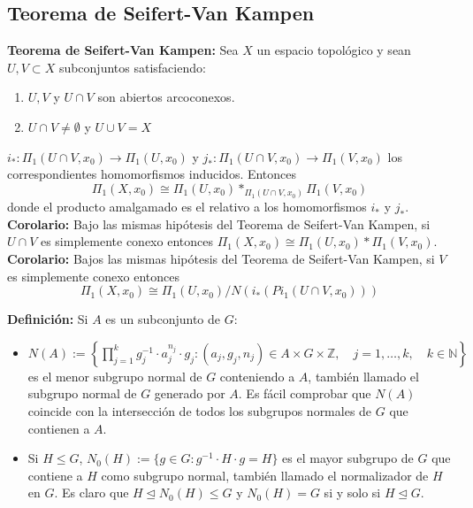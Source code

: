 \documentclass{article}
\begin{document}
\subsection{Teorema de Seifert-Van Kampen}
\textbf{Teorema de Seifert-Van Kampen:} Sea $X$ un espacio topológico y sean $U,V\subset X$ subconjuntos satisfaciendo:
\begin{enumerate}
\item $U,V$ y $U\cap V$ son abiertos arcoconexos.

\item $U\cap V\neq \emptyset$ y $U\cup V=X$
\end{enumerate}

$i_*:\Pi_1(U\cap V,x_0)\rightarrow \Pi_1(U,x_0)$ y $j_*:\Pi_1(U\cap V,x_0)\rightarrow \Pi_1(V,x_0)$ los correspondientes homomorfismos inducidos. Entonces
\begin{equation*}
\Pi_1(X,x_0)\cong \Pi_1(U,x_0)*_{\Pi_1(U\cap V,x_0)}\Pi_1(V,x_0)
\end{equation*}
donde el producto amalgamado es el relativo a los homomorfismos $i_*$ y $j_*$.\\

\textbf{Corolario:} Bajo las mismas hipótesis del Teorema de Seifert-Van Kampen, si $U\cap V$ es simplemente conexo entonces $\Pi_1(X,x_0)\cong \Pi_1(U,x_0)*\Pi_1(V,x_0)$. \\

\textbf{Corolario:} Bajos las mismas hipótesis del Teorema de Seifert-Van Kampen, si $V$ es simplemente conexo entonces 
\begin{equation*}
\Pi_1(X,x_0)\cong \Pi_1(U,x_0)/N(i_*(Pi_1(U\cap V,x_0)))
\end{equation*}

\textbf{Definición:} Si $A$ es un subconjunto de $G$:
\begin{itemize}
\item $N(A):=\left\lbrace \prod_{j=1}^k g_j^{-1}\cdot a_j^{n_j}\cdot g_j:(a_j,g_j,n_j)\in A\times G\times \mathbb{Z},\quad j=1,\ldots,k,\quad k\in \mathbb{N}\right\rbrace$ es el menor subgrupo normal de $G$ conteniendo a $A$, también llamado el subgrupo normal de $G$ generado por $A$. Es fácil comprobar que $N(A)$ coincide con la intersección de todos los subgrupos normales de $G$ que contienen a $A$.

\item Si $H\leq G$, $N_0(H):=\{g\in G:g^{-1}\cdot H\cdot g=H\}$ es el mayor subgrupo de $G$ que contiene a $H$ como subgrupo normal, también llamado el normalizador de $H$ en $G$. Es claro que $H\unlhd N_0(H)\leq G$ y $N_0(H)=G$ si y solo si $H\unlhd G$.
\end{itemize}
\end{document}
